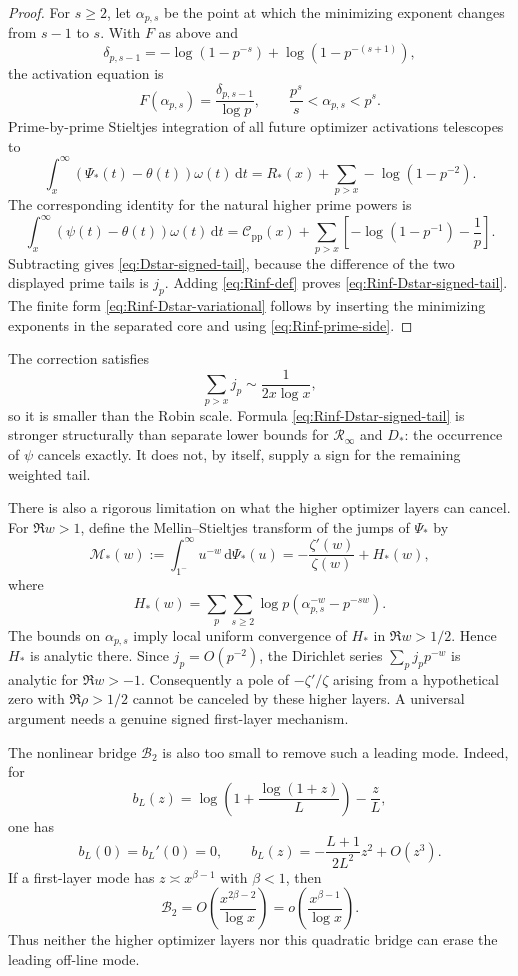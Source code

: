\documentclass[11pt,a4paper]{article}
\numberwithin{equation}{section}
\theoremstyle{definition}
\newcommand{\dd}{\,\mathrm{d}}
\newcommand{\Rinf}{\mathcal R_{\infty}}
\newcommand{\Btwo}{\mathcal B_{2}}
\newcommand{\Cpi}{\mathcal C_{\mathrm{pp}}}
\begin{document}
\begin{proof}
For \(s\ge2\), let \(\alpha_{p,s}\) be the point at which the minimizing
exponent changes from \(s-1\) to \(s\).  With \(F\) as above and
\[
  \delta_{p,s-1}
  =-\log(1-p^{-s})+\log(1-p^{-(s+1)}),
\]
the activation equation is
\[
  F(\alpha_{p,s})=\frac{\delta_{p,s-1}}{\log p},
  \qquad
  \frac{p^s}{s}<\alpha_{p,s}<p^s.
\]
Prime-by-prime Stieltjes integration of all future optimizer activations
telescopes to
\[
  \int_x^\infty(\Psi_*(t)-\theta(t))\omega(t)\dd t
  =R_*(x)+\sum_{p>x}-\log(1-p^{-2}).
\]
The corresponding identity for the natural higher prime powers is
\[
  \int_x^\infty(\psi(t)-\theta(t))\omega(t)\dd t
  =\Cpi(x)+\sum_{p>x}
  \left[-\log(1-p^{-1})-\frac1p\right].
\]
Subtracting gives \eqref{eq:Dstar-signed-tail}, because the difference of the
two displayed prime tails is \(j_p\).  Adding \eqref{eq:Rinf-def} proves
\eqref{eq:Rinf-Dstar-signed-tail}.  The finite form
\eqref{eq:Rinf-Dstar-variational} follows by inserting the minimizing
exponents in the separated core and using \eqref{eq:Rinf-prime-side}.
\end{proof}

The correction satisfies
\[
  \sum_{p>x}j_p\sim\frac1{2x\log x},
\]
so it is smaller than the Robin scale.  Formula
\eqref{eq:Rinf-Dstar-signed-tail} is stronger structurally than separate lower
bounds for \(\Rinf\) and \(D_*\): the occurrence of \(\psi\) cancels exactly.
It does not, by itself, supply a sign for the remaining weighted tail.

There is also a rigorous limitation on what the higher optimizer layers can
cancel.  For \(\Re w>1\), define the Mellin--Stieltjes transform of the jumps
of \(\Psi_*\) by
\[
  \mathcal M_*(w)
  :=\int_{1^-}^{\infty}u^{-w}\dd\Psi_*(u)
  =-\frac{\zeta'(w)}{\zeta(w)}+H_*(w),
\]
where
\[
  H_*(w)=\sum_p\sum_{s\ge2}\log p
  \left(\alpha_{p,s}^{-w}-p^{-sw}\right).
\]
The bounds on \(\alpha_{p,s}\) imply local uniform convergence of \(H_*\) in
\(\Re w>1/2\).  Hence \(H_*\) is analytic there.  Since \(j_p=O(p^{-2})\),
the Dirichlet series \(\sum_p j_p p^{-w}\) is analytic for \(\Re w>-1\).
Consequently a
pole of \(-\zeta'/\zeta\) arising from a hypothetical zero with
\(\Re\rho>1/2\) cannot be canceled by these higher layers.  A universal
argument needs a genuine signed first-layer mechanism.

The nonlinear bridge \(\Btwo\) is also too small to remove such a leading
mode.  Indeed, for
\[
  b_L(z)=\log\left(1+\frac{\log(1+z)}L\right)-\frac zL,
\]
one has
\[
  b_L(0)=b_L'(0)=0,
  \qquad
  b_L(z)=-\frac{L+1}{2L^2}z^2+O(z^3).
\]
If a first-layer mode has \(z\asymp x^{\beta-1}\) with \(\beta<1\), then
\[
  \Btwo
  =O\left(\frac{x^{2\beta-2}}{\log x}\right)
  =o\left(\frac{x^{\beta-1}}{\log x}\right).
\]
Thus neither the higher optimizer layers nor this quadratic bridge can erase
the leading off-line mode.
\end{document}
